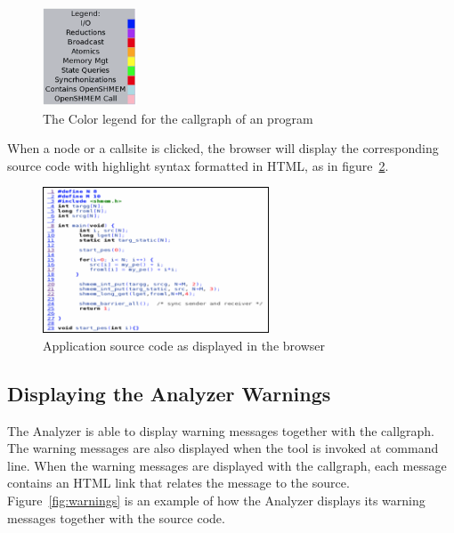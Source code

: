 \begin{figure}[!h]
  \begin{center}
    \includegraphics[width=0.25\textwidth]{./image006}
    \caption{The Color legend for the callgraph of an \openshmem program}
    \label{fig:colors}
  \end{center}
\end{figure}

When a node or a callsite is clicked, the browser will display the
corresponding source code with highlight syntax formatted in HTML, as
in figure~\ref{fig:app-source}.

\vspace{0.1in}

\begin{figure}[!h]
  \begin{center}
    \includegraphics[width=0.6\textwidth]{./image008}
    \caption{Application source code as displayed in the browser}
    \label{fig:app-source}
  \end{center}
\end{figure}

\subsection{Displaying the \openshmem Analyzer Warnings}

The \openshmem Analyzer is able to display \openshmem warning messages
together with the callgraph. The warning messages are also displayed
when the tool is invoked at command line. When the warning messages
are displayed with the callgraph, each message contains an HTML link
that relates the message to the source. Figure~\ref{fig:warnings} is
an example of how the \openshmem Analyzer displays its warning messages
together with the source code.

